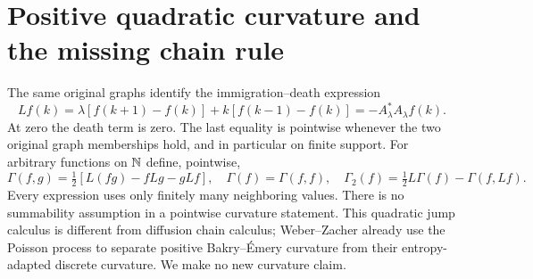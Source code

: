 \documentclass[11pt]{article}
\begin{document}
\section{Positive quadratic curvature and the missing chain rule}
The same original graphs identify the immigration--death expression
\begin{equation}\label{eq:jumpL}
 Lf(k)=\lambda[f(k+1)-f(k)]+k[f(k-1)-f(k)]
       =-A_\lambda^*A_\lambda f(k).
\end{equation}
At zero the death term is zero. The last equality is pointwise whenever
the two original graph memberships hold, and in particular on finite
support. For arbitrary functions on $\mathbb N$ define, pointwise,
\[
 \Gamma(f,g)=\tfrac12[L(fg)-fLg-gLf],\quad
 \Gamma(f)=\Gamma(f,f),\quad
 \Gamma_2(f)=\tfrac12 L\Gamma(f)-\Gamma(f,Lf).
\]
Every expression uses only finitely many neighboring values. There is
no summability assumption in a pointwise curvature statement.
This quadratic jump calculus is different from diffusion chain calculus;
Weber--Zacher \cite[Example 5.13]{WZ} already use the Poisson process to
separate positive Bakry--\'Emery curvature from their entropy-adapted
discrete curvature. We make no new curvature claim.
\end{document}
